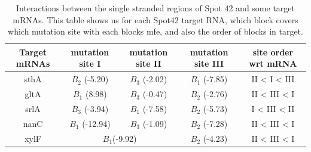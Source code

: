 \documentclass[twoside,a4paper]{report}
\numberwithin{equation}{section}
\begin{document}
\begin{table}[h!]
\centering
	\begin{tabular}{||c |c |c |c |c ||} 
		\hline
		Target mRNAs & mutation site I & mutation site II & mutation site III & site order wrt mRNA \\ [0.2ex] 
		\hline\hline
		sthA & $B_2$ (-5.20) & $B_3$ (-2.02) & $B_1$ (-7.85) & II < I < III\\ 
		\hline
		gltA & $B_1$ (8.98) & $B_3$ (-0.47)&  $B_2$ (-2.76)& II < III < I\\
		\hline
		srlA & $B_3$ (-3.94) & $B_1$ (-7.58) &  $B_2$ (-5.73) & I < III < II\\
		\hline
		nanC & $B_1$ (-12.94) & $B_3$ (-1.09) &  $B_2$ (-7.28)& II < III < I \\
		\hline
		xylF & \multicolumn{2}{|c|}{$B_1$(-9.92)} & $B_2$ (-4.23)& II < III < I \\  
	\hline
	\end{tabular}
	\caption{Interactions between the single stranded regions of Spot 42 and some target mRNAs. This table shows us for each Spot42 target RNA, which block covers which mutation site with each blocks mfe, and also the order of blocks in target.}
	\label{table:last}
\end{table}
\end{document}
